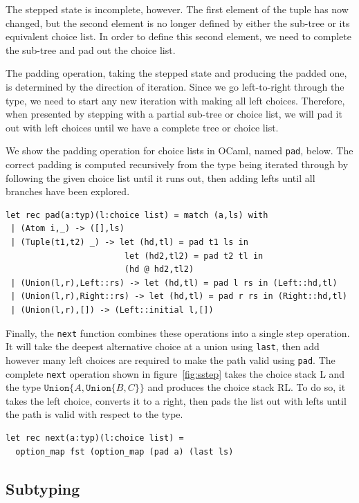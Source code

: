\documentclass[a4paper,english]{lipics-v2019}
\newcommand{\xt}[1]{\texttt{#1}}
\newcommand{\union}[2]{\xt{Union\{}#1,#2\xt{\}}}
\begin{document}
The stepped state is incomplete, however. The first element of the tuple has
now changed, but the second element is no longer defined by either the
sub-tree or its equivalent choice list. In order to define this second
element, we need to complete the sub-tree and pad out the choice list.

The padding operation, taking the stepped state and producing the padded one, is determined
by the direction of iteration. Since we go left-to-right through the type, we need to start
any new iteration with making all left choices. Therefore, when presented by stepping with
a partial sub-tree or choice list, we will pad it out with left choices until we have a complete
tree or choice list.

We show the padding operation for choice lists in OCaml, named
\verb|pad|, below.  The correct padding is computed recursively from
the type being iterated through by following the given choice list until it
runs out, then adding lefts until all branches have been explored.

\begin{lstlisting}
let rec pad(a:typ)(l:choice list) = match (a,ls) with
 | (Atom i,_) -> ([],ls)
 | (Tuple(t1,t2) _) -> let (hd,tl) = pad t1 ls in
                        let (hd2,tl2) = pad t2 tl in
                        (hd @ hd2,tl2)
 | (Union(l,r),Left::rs) -> let (hd,tl) = pad l rs in (Left::hd,tl)
 | (Union(l,r),Right::rs) -> let (hd,tl) = pad r rs in (Right::hd,tl)
 | (Union(l,r),[]) -> (Left::initial l,[])
\end{lstlisting}


Finally, the \verb|next| function combines these operations into
a single step operation. It will take the deepest alternative choice
at a union using \verb|last|, then add however many left
choices are required to make the path valid using \verb|pad|. The
complete \verb|next| operation shown in figure~\ref{fig:sstep} takes
the choice stack L and the type $\union{A}{\union{B}{C}}$ and produces the
choice stack RL. To do so, it takes the left choice, converts it to a right,
then pads the list out with lefts until the path is valid with respect to the 
type.

\begin{lstlisting}
let rec next(a:typ)(l:choice list) =
  option_map fst (option_map (pad a) (last ls)
\end{lstlisting}

\subsection{Subtyping}
\end{document}
